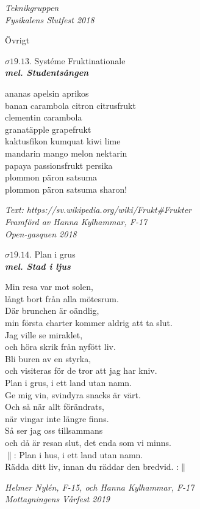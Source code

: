 \documentclass[a6paper,10pt]{article}
\newcommand{\mel}[1]{\small\textbf{\textit{mel. #1 \\}}}
\begin{document}
\begin{flushright}
\textit{Teknikgruppen \\ Fysikalens Slutfest 2018}
\end{flushright}
\begin{center}
\LARGE Övrigt \\
\end{center}
\begin{center}
\Large $\sigma19.13$. Systéme Fruktinationale\\
\mel{Studentsången}
\end{center} \small 
ananas apelsin aprikos\\
banan carambola citron citrusfrukt\\
clementin carambola \\
granatäpple grapefrukt\\
kaktusfikon kumquat kiwi lime\\
mandarin mango melon nektarin\\
papaya passionsfrukt persika\\
plommon päron satsuma\\
plommon päron satsuma sharon!
\begin{flushright}
\textit{Text: https://sv.wikipedia.org/wiki/Frukt\#Frukter\\ Framförd av Hanna Kylhammar, F-17 \\ Open-gasquen 2018}
\end{flushright}
\setlength{\oddsidemargin}{-0.37in}
\begin{center}
\Large $\sigma19.14$. Plan i grus\\
\mel{Stad i ljus}
\end{center} \small Min resa var mot solen,\\
långt bort från alla mötesrum.\\
Där brunchen är oändlig,\\
min första charter kommer aldrig att ta slut.
\vspace{5pt}\\
Jag ville se miraklet,\\
och höra skrik från nyfött liv.\\
Bli buren av en styrka,\\
och visiteras för de tror att jag har kniv.
\vspace{5pt}\\
Plan i grus, i ett land utan namn.\\
Ge mig vin, svindyra snacks är värt.
\vspace{5pt}\\
Och så när allt förändrats,\\
när vingar inte längre finns.\\
Så ser jag oss tillsammans\\
och då är resan slut, det enda som vi minns.
\vspace{5pt}\\
$\|$: Plan i hus, i ett land utan namn.\\
Rädda ditt liv, innan du räddar den bredvid. :$\|$

\begin{flushright}
\textit{Helmer Nylén, F-15, och Hanna Kylhammar, F-17\\ Mottagningens Vårfest 2019}
\end{flushright}
\end{document}
